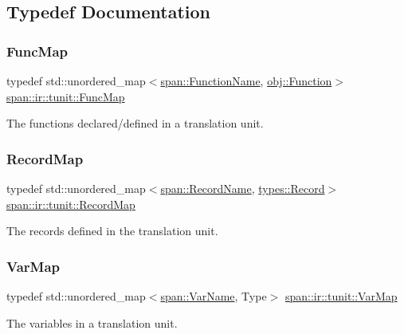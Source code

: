 \subsection{Typedef Documentation}
\mbox{\label{namespacespan_1_1ir_1_1tunit_a8c9ac0f8660f3f103f7b1ecb106b583b}} 
\subsubsection{\texorpdfstring{Func\+Map}{FuncMap}}
{\footnotesize\ttfamily typedef std\+::unordered\+\_\+map$<$\hyperlink{namespacespan_a5184c08609df37077d47e497f83aadd1}{span\+::\+Function\+Name}, \hyperlink{classspan_1_1ir_1_1obj_1_1Function}{obj\+::\+Function}$>$ \hyperlink{namespacespan_1_1ir_1_1tunit_a8c9ac0f8660f3f103f7b1ecb106b583b}{span\+::ir\+::tunit\+::\+Func\+Map}}



The functions declared/defined in a translation unit. 

\mbox{\label{namespacespan_1_1ir_1_1tunit_a466edb24fa3caa23d32ca7bc2cdeac12}} 
\subsubsection{\texorpdfstring{Record\+Map}{RecordMap}}
{\footnotesize\ttfamily typedef std\+::unordered\+\_\+map$<$\hyperlink{namespacespan_a556ddaab2ad6c39fb1d89fb38182fe57}{span\+::\+Record\+Name}, \hyperlink{classspan_1_1ir_1_1types_1_1Record}{types\+::\+Record}$>$ \hyperlink{namespacespan_1_1ir_1_1tunit_a466edb24fa3caa23d32ca7bc2cdeac12}{span\+::ir\+::tunit\+::\+Record\+Map}}



The records defined in the translation unit. 

\mbox{\label{namespacespan_1_1ir_1_1tunit_ab87decca6ee3f2091cb24b47d831aa44}} 
\subsubsection{\texorpdfstring{Var\+Map}{VarMap}}
{\footnotesize\ttfamily typedef std\+::unordered\+\_\+map$<$\hyperlink{namespacespan_adc1e351442e4f323d37dbbb8736d003f}{span\+::\+Var\+Name}, Type$>$ \hyperlink{namespacespan_1_1ir_1_1tunit_ab87decca6ee3f2091cb24b47d831aa44}{span\+::ir\+::tunit\+::\+Var\+Map}}



The variables in a translation unit. 

